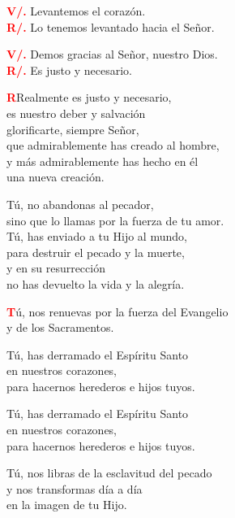 \documentclass[12pt, letterpaper]{report}
\begin{document}
\noindent
\Large {\bfseries \textcolor{red}{V/.}} \hspace{0.5cm} Levantemos el coraz\'on.\\
\noindent
\Large {\bfseries \textcolor{red}{R/.}} \hspace{0.5cm} Lo tenemos levantado hacia el Se\~nor. 

\noindent
\Large {\bfseries \textcolor{red}{V/.}} \hspace{0.5cm} Demos gracias al Se\~nor, nuestro Dios.\\
\noindent
\Large {\bfseries \textcolor{red}{R/.}} \hspace{0.5cm} Es justo y necesario.

\lettrine[lines=2]{\bfseries \textcolor{red}{R}}{}\Large Realmente es justo y necesario,\\
es nuestro deber y salvaci\'on\\
glorificarte, siempre Se\~nor,\\
que admirablemente has creado al hombre,\\
y m\'as admirablemente has hecho en \'el\\
una nueva creaci\'on.

\noindent
\Large T\'u, no abandonas al pecador,\\
sino que lo llamas por la fuerza de tu amor.\\
T\'u, has enviado a tu Hijo al mundo,\\
para destruir el pecado y la muerte,\\
y en su resurrecci\'on\\
no has devuelto la vida y la alegr\'ia.

\lettrine[lines=2]{\bfseries \textcolor{red}{T}}{}\Large \'u, nos renuevas por la fuerza del Evangelio\\
y de los Sacramentos.

\noindent
\Large T\'u, has derramado el Esp\'iritu Santo\\
en nuestros corazones,\\
para hacernos herederos e hijos tuyos.

\noindent
\Large T\'u, has derramado el Esp\'iritu Santo\\
en nuestros corazones,\\
para hacernos herederos e hijos tuyos.

\noindent
\Large T\'u, nos libras de la esclavitud del pecado\\
y nos transformas d\'ia a d\'ia\\
en la imagen de tu Hijo.
\end{document}
